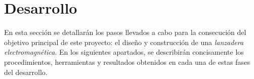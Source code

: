 \section{Desarrollo}

En esta sección se detallarán los pasos llevados a cabo para la consecución del objetivo principal de este proyecto: el diseño y construcción de una \textit{lanzadera electromagnética}. En los siguientes apartados, se describirán concisamente los procedimientos, herramientas y resultados obtenidos en cada una de estas fases del desarrollo.